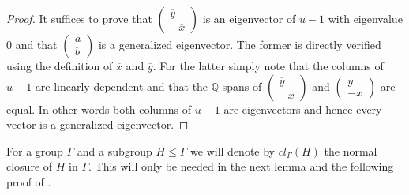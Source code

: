 \documentclass[a4paper,10pt]{amsart}
\theoremstyle{definition}
\theoremstyle{remark}
\newcommand\ov{\overline}
\newcommand{\Q}{{\mathbb Q}}
\begin{document}
\begin{proof}
\noindent It suffices to prove that $\begin{pmatrix}
\ov{y} \\ -\ov{x}
\end{pmatrix}$ is an eigenvector of $u-1$ with eigenvalue $0$ and that $\begin{pmatrix}
a \\ b
\end{pmatrix}$ is a generalized eigenvector. The former is directly verified using the definition of $\ov{x}$ and $\ov{y}$. For the latter simply note that the columns of $u-1$ are linearly dependent and that the $\Q$-spans of $\begin{pmatrix}
\ov{y} \\ -\ov{x}
\end{pmatrix}$ and $\begin{pmatrix}
y \\ -x
\end{pmatrix}$ are equal. In other words both columns of $u-1$ are eigenvectors and hence every vector is a generalized eigenvector. 
\end{proof}

For a group $\Gamma$ and a subgroup $H\leq \Gamma$ we will denote by $cl_\Gamma(H)$ the normal closure of $H$ in $\Gamma$. This will only be needed in the next lemma and the following proof of .
\end{document}
